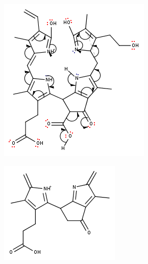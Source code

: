 \begin{figure}[!htbp]
  \begin{subfigure}[b]{0.5\textwidth}
    \includegraphics[width=\textwidth]{figures/Kapitel7/Kataboliten/fragmentation_structures/VWA_Katabolit_619_MH-CO2-RingA-RIngD_311_electronMovement.png}
    \caption{}
    \label{fig:619MHElectronMovement}
  \end{subfigure}
  \hfill
  \begin{subfigure}[b]{0.5\textwidth}
    \includegraphics[width=\textwidth]{figures/Kapitel7/Kataboliten/fragmentation_structures/VWA_Katabolit_619-CO2-RingA-RingD_311.png}

\end{subfigure}
\end{figure}
